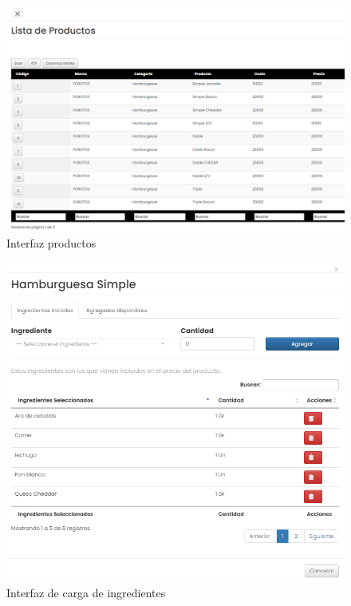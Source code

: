 \begin{figure}[H]
    \begin{center}
      \includegraphics[scale=0.45]{./sistema/lista productos.png}
      \caption{Interfaz productos}
      \label{fig:product}
    \end{center}
  \end{figure}

  \begin{figure}[H]
    \begin{center}
      \includegraphics[scale=0.50]{./sistema/ingrediente_de_producto.png}
      \caption{Interfaz de carga de ingredientes}
      \label{fig:product}
    \end{center}
  \end{figure}

